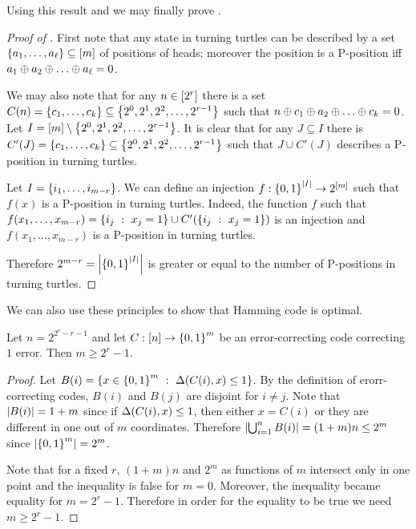Using this result and  we may
finally prove .
\begin{proof}[Proof of ]
  First note that any state in turning turtles can be described by a set 
  $\set{a_1, \dots, a_\ell} \subseteq \range{m}$ of positions of heads; moreover
  the position is a P-position iff 
  $a_1 \bitwisexor a_2 \bitwisexor \dots \bitwisexor a_\ell = 0$.

  We may also note that for any $n \in  {[{2^r}]}$ there is a set $C(n) =
  \set{c_1, \dots, c_k} \subseteq \set{2^0, 2^1, 2^2, \dots, 2^{r - 1}}$ such
  that 
  $n \bitwisexor c_1 \bitwisexor a_2 \bitwisexor \dots \bitwisexor c_k = 0$.
  Let $I = \range{m} \setminus \set{2^0, 2^1, 2^2, \dots, 2^{r - 1}}$.
  It is clear that for any $J \subseteq I$ there is 
  $C'(J) = \set{c_1, \dots, c_k} \subseteq 
    \set{2^0, 2^1, 2^2, \dots, 2^{r - 1}}$ such that $J \cup C'(J)$ describes a
  P-position in turning turtles.

  Let $I = \set{i_1, \dots, i_{m - r}}$. We can define an injection 
  $f : \set{0, 1}^{\cardinality{I}} \to 2^{\range{m}}$ such that $f(x)$ is a 
  P-position in turning turtles. Indeed, the function $f$ such that
  $f(x_1, \dots, x_{m - r}) = \set[x_j = 1]{i_j} \cup C'(\set[x_j = 1]{i_j})$
  is an injection and $f(x_1, \dots, x_{m - r})$ is a P-position in turning
  turtles.

  Therefore $2^{m - r} = \cardinality{\set{0, 1}^{\cardinality{I}}}$ is greater
  or equal to the number of P-positions in turning turtles.
\end{proof}

We can also use these principles to show that Hamming code is optimal.
\begin{theorem}
  Let $n = 2^{2^r - r - 1}$ and let $C : \range{n} \to \set{0, 1}^m$ be an
  error-correcting code correcting $1$ error. Then $m \ge 2^r - 1$.
\end{theorem}
\begin{proof}
  Let $B(i) = \set[{\hammingDist{C(i)}{x} \le 1}]{x \in \set{0, 1}^m}$.
  By the definition of erorr-correcting codes, $B(i)$ and $B(j)$ are disjoint 
  for $i \neq j$. Note that $\left|{B(i)}\right| = 1 + m$ since if
  $\Delta({C(i)}, {x}) \le 1$, then either $x = C(i)$ or they are different in
  one out of $m$ coordinates. Therefore $\left|{\bigcup_{i = 1}^n B(i)}\right|
  = (1 + m) n \le 2^m$ since $\cardinality{\set{0, 1}^m} = 2^m$. 

  Note that for a fixed $r$, $(1 + m) n$ and $2^m$ as functions of $m$ intersect
  only in one point and the inequality is false for $m = 0$. Moreover, the
  inequality became equality for $m = 2^r - 1$. Therefore in order for the
  equality to be true we need $m \ge 2^r - 1$.
\end{proof}

